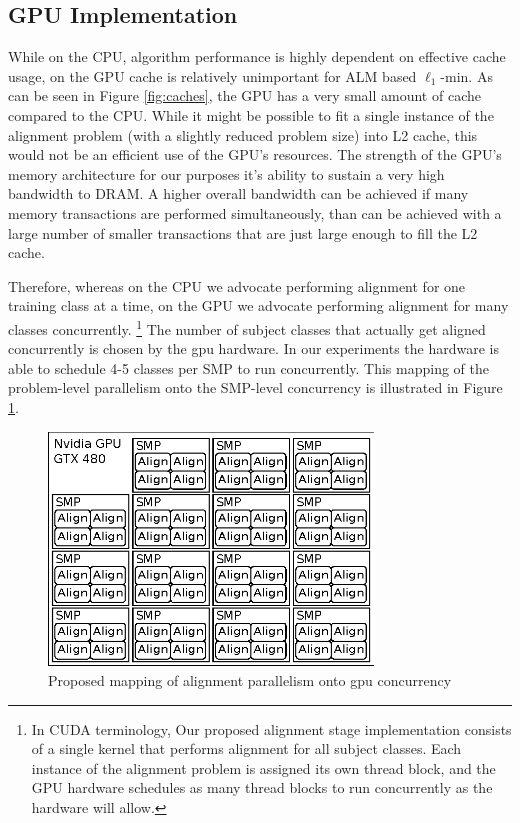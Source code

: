 \documentclass[10pt,twocolumn,letterpaper]{article}
\begin{document}
\subsection{GPU Implementation}
\label{sec:alignment_implementation_gpu}
While on the CPU, algorithm performance is highly dependent on effective
cache usage, on the GPU cache is relatively unimportant for ALM based
$\ell_1$-min.  As can be seen in Figure \ref{fig:caches}, the GPU has 
a very small amount of cache compared to the CPU.  While it might be possible
to fit a single instance of the alignment problem (with a slightly reduced problem size)
into L2 cache, this would not be an efficient use of the GPU's resources.
The strength of the GPU's memory architecture for our purposes it's ability to sustain a very
high bandwidth to DRAM.  A higher overall bandwidth can be achieved if 
many memory transactions are performed simultaneously, than can be achieved
with a large number of smaller transactions that are just large enough to fill
the L2 cache.

Therefore, whereas on the CPU we advocate performing alignment for one training
class at a time, on the GPU we advocate performing alignment for many classes
concurrently.  \footnote{In CUDA terminology, Our proposed alignment stage
implementation consists of a single kernel that performs alignment for all
subject classes.  Each instance of the alignment problem is assigned its own
thread block, and the GPU hardware schedules as many thread blocks to run
concurrently as the hardware will allow.} The number of subject classes that
actually get aligned concurrently is chosen by the gpu hardware. In our
experiments the hardware is able to schedule 4-5 classes per SMP to run
concurrently. This mapping of the problem-level parallelism onto the SMP-level
concurrency is illustrated in Figure \ref{fig:alignment_mapping_gpu}.

\begin{figure}
\centering
\includegraphics[width=3.4in]{figures/alignment_mapping_gpu}
\caption{Proposed mapping of alignment parallelism onto gpu concurrency}
\label{fig:alignment_mapping_gpu}
\end{figure}
\end{document}
